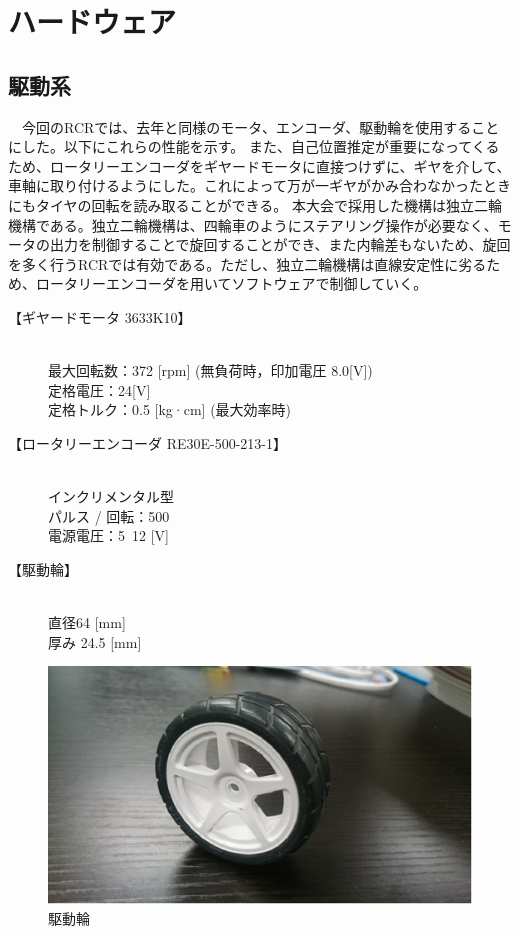 \documentclass[11pt,a4paper]{jsarticle}
\begin{document}
\section{ハードウェア}
\subsection{駆動系}
　今回のRCRでは、去年と同様のモータ、エンコーダ、駆動輪を使用することにした。以下にこれらの性能を示す。
また、自己位置推定が重要になってくるため、ロータリーエンコーダをギヤードモータに直接つけずに、ギヤを介して、車軸に取り付けるようにした。これによって万が一ギヤがかみ合わなかったときにもタイヤの回転を読み取ることができる。
本大会で採用した機構は独立二輪機構である。独立二輪機構は、四輪車のようにステアリング操作が必要なく、モータの出力を制御することで旋回することができ、また内輪差もないため、旋回を多く行うRCRでは有効である。ただし、独立二輪機構は直線安定性に劣るため、ロータリーエンコーダを用いてソフトウェアで制御していく。

\begin{description}
 \item[【ギヤードモータ 3633K10】] \mbox{} \\ 
	    最大回転数：372 [rpm] (無負荷時，印加電圧 8.0[V]) \\
	    定格電圧：24[V] \\
	    定格トルク：0.5 [kg·cm] (最大効率時)        
 \item[【ロータリーエンコーダ RE30E-500-213-1】] \mbox{} \\
	    インクリメンタル型 \\
	    パルス / 回転：500 \\
	    電源電圧：5~12 [V] 
 \item[【駆動輪】] \mbox{} \\
	    直径64 [mm] \\
	    厚み 24.5 [mm]
\end{description}


\begin{figure}[b]
 \begin{center}
  \includegraphics[scale=.5]{./picture/picture1.eps}
  \caption{駆動輪}
 \end{center}
\end{figure}
\end{document}

